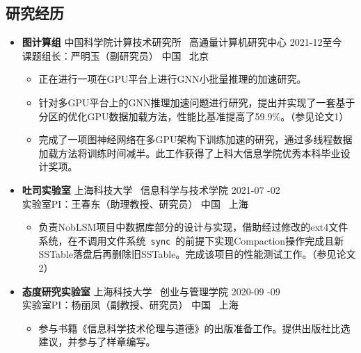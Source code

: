 \documentclass[a4paper,10pt]{ctexart} %
\begin{document}
\begin{keepsection}
\subsection{研究经历}
\begin{itemize}
    \item \textbf{图计算组} \quad 中国科学院计算技术研究所 \, 高通量计算机研究中心 \hfill 2021-12至今 \\
    {\small 课题组长：严明玉（副研究员）} \hfill 中国 \, 北京
    \begin{small}
        \begin{itemize}
            \item 正在进行一项在GPU平台上进行GNN小批量推理的加速研究。
            \item 针对多GPU平台上的GNN推理加速问题进行研究，提出并实现了一套基于分区的优化GPU数据加载方法，性能比基准提高了59.9\%。（参见论文1）
            \item 完成了一项图神经网络在多GPU架构下训练加速的研究，通过多线程数据加载方法将训练时间减半。此工作获得了上科大信息学院优秀本科毕业设计奖项。
        \end{itemize}
    \end{small}

    \item \textbf{吐司实验室} \quad 上海科技大学 \, 信息科学与技术学院 \hfill 2021-07 -02 \\
    {\small 实验室PI：王春东（助理教授、研究员）} \hfill 中国 \, 上海
    \begin{small}
        \begin{itemize}
            \item 负责NobLSM项目中数据库部分的设计与实现，借助经过修改的ext4文件系统，在不调用文件系统~\texttt{sync}~的前提下实现Compaction操作完成且新SSTable落盘后再删除旧SSTable。完成该项目的性能测试工作。（参见论文2）
        \end{itemize}
    \end{small}

    \item \textbf{态度研究实验室} \quad 上海科技大学 \, 创业与管理学院 \hfill 2020-09 -09 \\
    {\small 实验室PI：杨丽凤（副教授、研究员）} \hfill 中国 \, 上海
    \begin{small}
        \begin{itemize}
            \item 参与书籍《信息科学技术伦理与道德》的出版准备工作。提供出版社比选建议，并参与了样章编写。
        \end{itemize}
    \end{small}
\end{itemize}
\end{keepsection}
\end{document}
